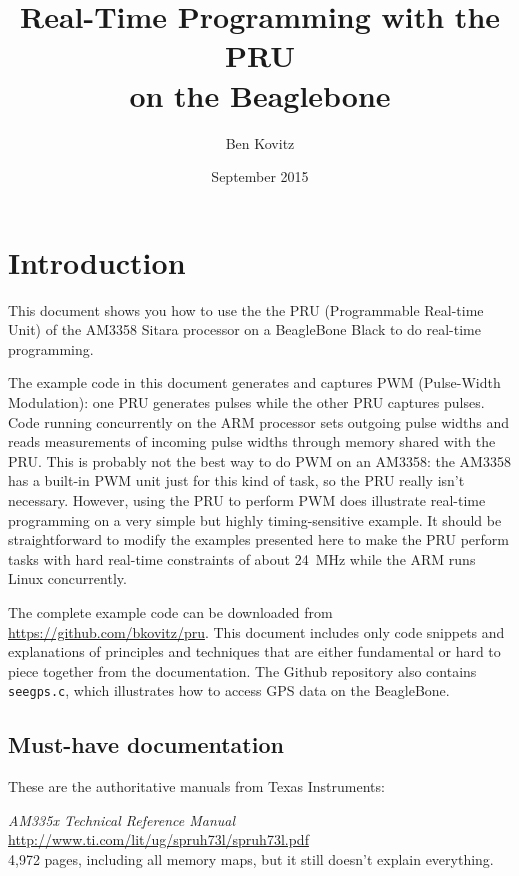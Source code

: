 \documentclass[letterpaper,11pt,fleqn]{article}
\title{Real-Time Programming with the PRU \\ on the Beaglebone}
\author{Ben Kovitz}
\date{September 2015}
\newenvironment{docref}
   {\vspace{\baselineskip}\noindent\begin{minipage}{\textwidth}\raggedright}
   {\end{minipage}}
\begin{document}
\maketitle

\tableofcontents

\section{Introduction}

This document shows you how to use the the PRU (Programmable Real-time Unit)
of the AM3358 Sitara processor on a BeagleBone Black to do real-time
programming.

The example code in this document generates and captures PWM (Pulse-Width
Modulation): one PRU generates pulses while the other PRU captures pulses.
Code running concurrently on the ARM processor sets outgoing pulse widths and
reads measurements of incoming pulse widths through memory shared with the
PRU.  This is probably not the best way to do PWM on an AM3358: the AM3358 has
a built-in PWM unit just for this kind of task, so the PRU really isn't
necessary. However, using the PRU to perform PWM does illustrate real-time
programming on a very simple but highly timing-sensitive example. It should be
straightforward to modify the examples presented here to make the PRU perform
tasks with hard real-time constraints of about 24~MHz while the ARM runs Linux
concurrently.

The complete example code can be downloaded from
\url{https://github.com/bkovitz/pru}. \label{sec-repo}
This document includes only code
snippets and explanations of principles and techniques that are either
fundamental or hard to piece together from the documentation. The Github
repository also contains \texttt{seegps.c}, which illustrates how to access
GPS data on the BeagleBone.

\subsection{Must-have documentation}

These are the authoritative manuals from Texas Instruments:

\nopagebreak
\begin{docref}
\textit{AM335x Technical Reference Manual} \\
\url{http://www.ti.com/lit/ug/spruh73l/spruh73l.pdf} \\
4,972 pages, including all memory maps, but it still doesn't explain everything.
\end{docref}
\end{document}
